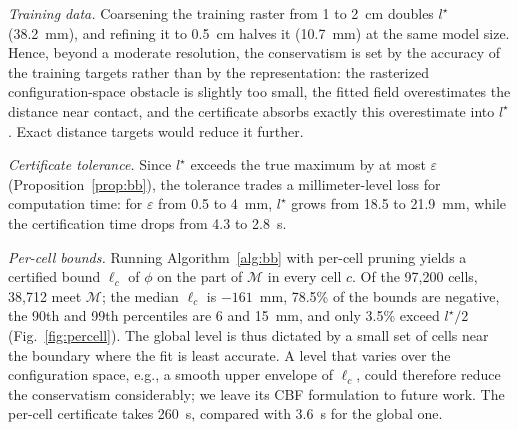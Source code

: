 \documentclass[journal]{IEEEtran}
\theoremstyle{definition}
\newcommand{\Mset}{\mathcal{M}}
\begin{document}
\emph{Training data.} Coarsening the training raster from 1 to 2~cm doubles $l^\star$ (38.2~mm),
and refining it to 0.5~cm halves it (10.7~mm) at the same model size. Hence, beyond a moderate
resolution, the conservatism is set by the accuracy of the training targets rather than by the
representation: the rasterized configuration-space obstacle is slightly too small, the fitted field
overestimates the distance near contact, and the certificate absorbs exactly this overestimate into
$l^\star$. Exact distance targets would reduce it further.

\emph{Certificate tolerance.} Since $l^\star$ exceeds the true maximum by at most $\varepsilon$
(Proposition~\ref{prop:bb}), the tolerance trades a millimeter-level loss for computation time: for
$\varepsilon$ from 0.5 to 4~mm, $l^\star$ grows from 18.5 to 21.9~mm, while the certification time
drops from 4.3 to 2.8~s.

\emph{Per-cell bounds.} Running Algorithm~\ref{alg:bb} with per-cell pruning yields a certified bound
$\ell_c$ of $\phi$ on the part of $\Mset$ in every cell $c$. Of the 97{,}200 cells, 38{,}712 meet
$\Mset$; the median $\ell_c$ is $-161$~mm, 78.5\% of the bounds are negative, the 90th and 99th
percentiles are 6 and 15~mm, and only 3.5\% exceed $l^\star/2$ (Fig.~\ref{fig:percell}). The global
level is thus dictated by a small set of cells near the boundary where the fit is least accurate.
A level that varies over the configuration space, e.g., a smooth upper envelope of $\ell_c$, could
therefore reduce the conservatism considerably; we leave its CBF formulation to future work. The
per-cell certificate takes 260~s, compared with 3.6~s for the global one.
\end{document}
